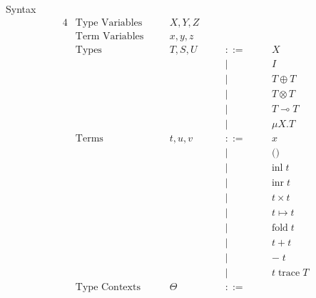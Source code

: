 \documentclass[10pt]{jsarticle}
\newcommand{\bnfdef}{::=}
\begin{document}
\begin{itembox}[c]{Syntax}
  \begin{alignat*}{4}
    &\text{Type Variables}  & \quad &X,Y,Z  & \quad &        & \quad & \\
    &\text{Term Variables}  &       &x,y,z  &       &        &       & \\
    &\text{Types}           &       &T,S,U  &       &\bnfdef &       & X \\
    &                       &       &       &       &|       &       & I \\
    &                       &       &       &       &|       &       & T \oplus T \\
    &                       &       &       &       &|       &       & T \otimes T \\
    &                       &       &       &       &|       &       & T \multimap T \\
    &                       &       &       &       &|       &       & \mu{X}.T \\
    &\text{Terms}           &       &t,u,v  &       &\bnfdef &       & x \\
    &                       &       &       &       &|       &       & \text{()} \\
    &                       &       &       &       &|       &       & \text{inl}\;t \\
    &                       &       &       &       &|       &       & \text{inr}\;t \\
    &                       &       &       &       &|       &       & t\times{}t \\
    &                       &       &       &       &|       &       & t\mapsto{}t \\
    &                       &       &       &       &|       &       & \text{fold}\;t \\
    &                       &       &       &       &|       &       & t+t \\
    &                       &       &       &       &|       &       & -\;t \\
    &                       &       &       &       &|       &       & t\;\text{trace}\;T \\
    &\text{Type Contexts}   &       &\Theta &       &\bnfdef &       & \\

\end{alignat*}
\end{itembox}
\end{document}
